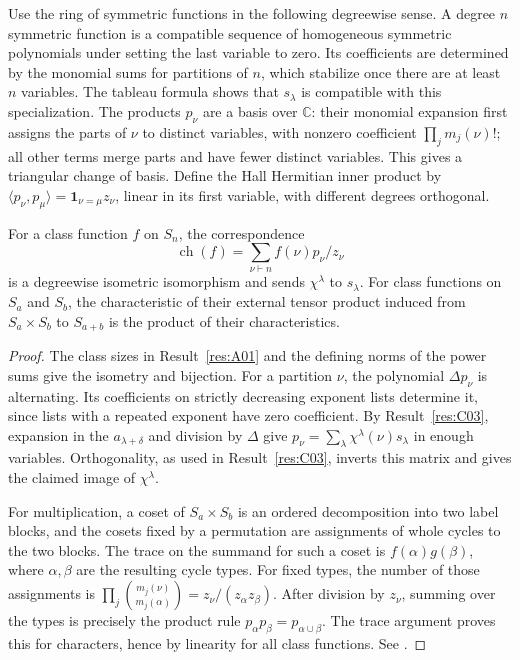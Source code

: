Use the ring of symmetric functions in the following degreewise
sense. A degree \(n\) symmetric function is a compatible sequence of
homogeneous symmetric polynomials under setting the last variable to
zero. Its coefficients are determined by the monomial sums for
partitions of \(n\), which stabilize once there are at least \(n\)
variables. The tableau formula shows that \(s_\lambda\) is compatible
with this specialization. The products \(p_\nu\) are a basis over
\(\mathbb C\):
their monomial expansion first assigns the parts of \(\nu\) to
distinct variables, with nonzero coefficient \(\prod_j m_j(\nu)!\);
all other terms merge parts and have fewer distinct variables.
This gives a triangular change of basis. Define the Hall Hermitian
inner product by \(\langle p_\nu,p_\mu\rangle
=\boldsymbol{1}_{\nu=\mu}z_\nu\), linear in its first variable,
with different degrees orthogonal.

\begin{theorem}\label{res:C05}
For a class function \(f\) on \(S_n\), the correspondence
\[
 \operatorname{ch}(f)=\sum_{\nu\vdash n}f(\nu)p_\nu/z_\nu
\]
is a degreewise isometric isomorphism and sends \(\chi^\lambda\) to
\(s_\lambda\). For class functions on \(S_a\) and \(S_b\), the
characteristic of their external tensor product induced from
\(S_a\times S_b\) to \(S_{a+b}\) is the product of their
characteristics.
\end{theorem}

\begin{proof}
The class sizes in Result~\ref{res:A01} and the defining norms of the
power sums give the isometry and bijection. For a partition \(\nu\),
the polynomial \(\Delta p_\nu\) is alternating. Its coefficients on
strictly decreasing exponent lists determine it, since lists with a
repeated exponent have zero coefficient. By Result~\ref{res:C03},
expansion in the \(a_{\lambda+\delta}\) and division by \(\Delta\)
give \(p_\nu=\sum_{\lambda}\chi^\lambda(\nu)s_\lambda\) in enough
variables. Orthogonality, as used in Result~\ref{res:C03}, inverts
this matrix and gives the claimed image of \(\chi^\lambda\).

For multiplication, a coset of \(S_a\times S_b\) is an ordered
decomposition into two label blocks, and the cosets fixed by a
permutation are assignments of whole cycles to the two blocks.
The trace on the summand for such a coset is \(f(\alpha)g(\beta)\),
where \(\alpha,\beta\) are the resulting cycle types. For fixed
types, the number of those assignments is
\(\prod_j\binom{m_j(\nu)}{m_j(\alpha)}=z_\nu/(z_\alpha z_\beta)\).
After division by \(z_\nu\), summing over the types is precisely the
product rule \(p_\alpha p_\beta=p_{\alpha\cup\beta}\). The trace
argument proves this for characters, hence by linearity for all
class functions. See \cite[Sections 4.6--4.7]{sagan}.
\end{proof}


